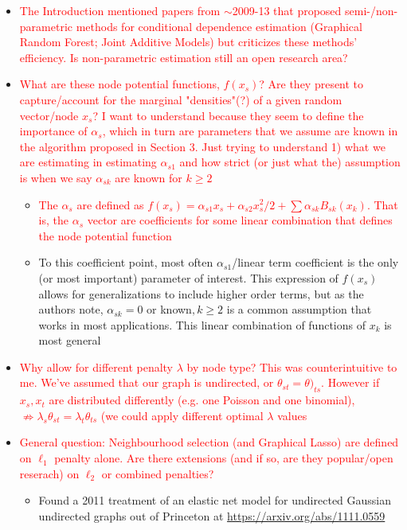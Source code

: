 \documentclass[11pt]{article}
\begin{document}
	\begin{itemize}
	
		\item \textcolor{red}{The Introduction mentioned papers from \(\sim\)2009-13 that proposed semi-/non-parametric methods for conditional dependence estimation (Graphical Random Forest; Joint Additive Models) but criticizes these methods' efficiency. Is non-parametric estimation still an open research area?}
		
		\item \textcolor{red}{What are these node potential functions, $f(x_s)$? Are they present to capture/account for the marginal "densities"(?) of a given random vector/node $x_s$? I want to understand because they seem to define the importance of $\alpha_s$, which in turn are parameters that we assume are known in the algorithm proposed in Section 3. Just trying to understand 1) what we are estimating in estimating $\alpha_{s1}$ and how strict (or just what the) assumption is when we say $\alpha_{sk}$ are known for $k\geq 2$}
		\begin{itemize}
            \item \textcolor{red}{The $\alpha_s$ are defined as $f(x_s) = \alpha_{s1}x_s + \alpha_{s2}x_s^2/2 + \sum \alpha_{sk}B_{sk}(x_k)$. That is, the $\alpha_s$ vector are coefficients for some linear combination that defines the node potential function}
            \item To this coefficient point, most often $\alpha_{s1}$/linear term coefficient is the only (or most important) parameter of interest. This expression of $f(x_s)$ allows for generalizations to include higher order terms, but as the authors note, $\alpha_{sk}=0$ or known$, k\geq 2$ is a common assumption that works in most applications. This linear combination of functions of $x_k$ is most general 
        \end{itemize}

		\item \textcolor{red}{Why allow for different penalty $\lambda$ by node type? This was counterintuitive to me. We've assumed that our graph is undirected, or $\theta_{st}=\theta)_{ts}$. However if $x_s, x_t$ are distributed differently (e.g. one Poisson and one binomial), $\not \Rightarrow \lambda_s \theta_{st}= \lambda_t \theta_{ts}$ (we could apply different optimal $\lambda$ values}
		
		\item \textcolor{red}{General question: Neighbourhood selection (and Graphical Lasso) are defined on $\ell_1$ penalty alone. Are there extensions (and if so, are they popular/open reserach) on $\ell_2$ or combined penalties?}
			\begin{itemize}
                \item Found a 2011 treatment of an elastic net model for undirected Gaussian undirected graphs out of Princeton at \url{https://arxiv.org/abs/1111.0559}
            \end{itemize} 			
	\end{itemize}
	
\end{document}
